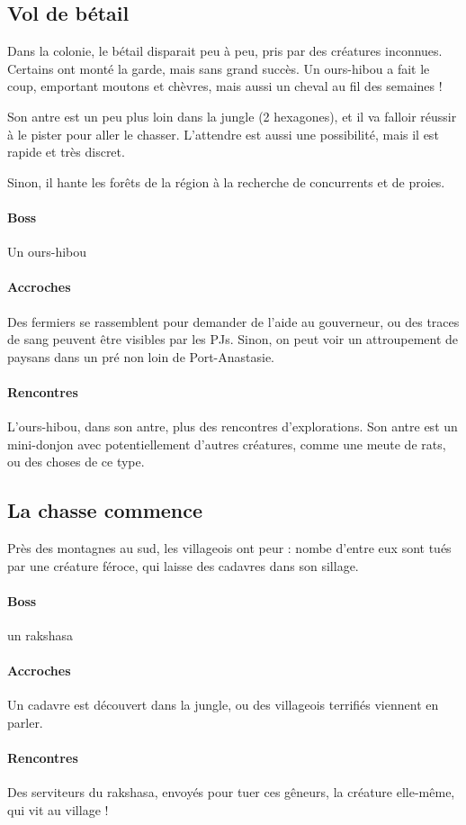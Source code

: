 \documentclass[10pt,a4paper]{book}
\begin{document}
\subsection{Vol de bétail}
Dans la colonie, le bétail disparait peu à peu, pris par des créatures inconnues. Certains ont monté la garde, mais sans grand succès. Un ours-hibou a fait le coup, emportant moutons et chèvres, mais aussi un cheval au fil des semaines !

Son antre est un peu plus loin dans la jungle (2 hexagones), et il va falloir réussir à le pister pour aller le chasser. L'attendre est aussi une possibilité, mais il est rapide et très discret.

Sinon, il hante les forêts de la région à la recherche de concurrents et de proies.
\paragraph{Boss}Un ours-hibou
\paragraph{Accroches} Des fermiers se rassemblent pour demander de l'aide au gouverneur, ou des traces de sang peuvent être visibles par les PJs. Sinon, on peut voir un attroupement de paysans dans un pré non loin de Port-Anastasie.
\paragraph{Rencontres} L'ours-hibou, dans son antre, plus des rencontres d'explorations. Son antre est un mini-donjon avec potentiellement d'autres créatures, comme une meute de rats, ou des choses de ce type. 
\subsection{La chasse commence}
Près des montagnes au sud, les villageois ont peur : nombe d'entre eux sont tués par une créature féroce, qui laisse des cadavres dans son sillage.
\paragraph{Boss}un rakshasa
\paragraph{Accroches} Un cadavre est découvert dans la jungle, ou des villageois terrifiés viennent en parler.
\paragraph{Rencontres}Des serviteurs du rakshasa, envoyés pour tuer ces gêneurs, la créature elle-même, qui vit au village ! 
\end{document}
